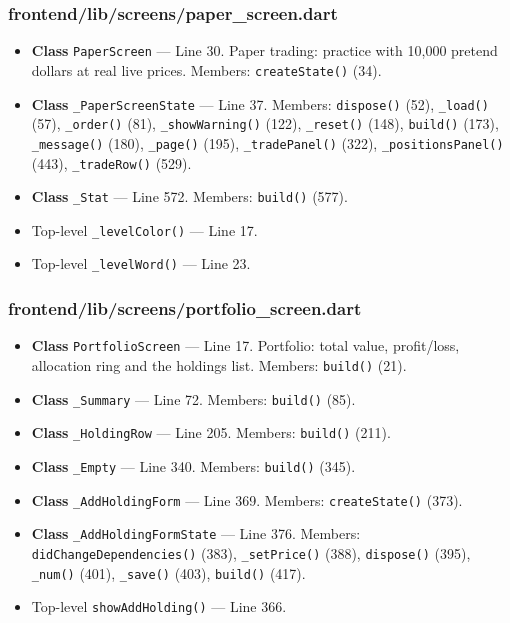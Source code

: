 \subsubsection*{frontend/lib/screens/paper\_screen.dart}
\begin{itemize}[nosep,leftmargin=1.5em]
\item \textbf{Class} \texttt{PaperScreen} --- Line 30. Paper trading: practice with 10,000 pretend dollars at real live prices. Members: \texttt{createState(\allowbreak{})} (34).
\item \textbf{Class} \texttt{\_\allowbreak{}PaperScreenState} --- Line 37. Members: \texttt{dispose(\allowbreak{})} (52), \texttt{\_\allowbreak{}load(\allowbreak{})} (57), \texttt{\_\allowbreak{}order(\allowbreak{})} (81), \texttt{\_\allowbreak{}showWarning(\allowbreak{})} (122), \texttt{\_\allowbreak{}reset(\allowbreak{})} (148), \texttt{build(\allowbreak{})} (173), \texttt{\_\allowbreak{}message(\allowbreak{})} (180), \texttt{\_\allowbreak{}page(\allowbreak{})} (195), \texttt{\_\allowbreak{}tradePanel(\allowbreak{})} (322), \texttt{\_\allowbreak{}positionsPanel(\allowbreak{})} (443), \texttt{\_\allowbreak{}tradeRow(\allowbreak{})} (529).
\item \textbf{Class} \texttt{\_\allowbreak{}Stat} --- Line 572. Members: \texttt{build(\allowbreak{})} (577).
\item Top-level \texttt{\_\allowbreak{}levelColor(\allowbreak{})} --- Line 17.
\item Top-level \texttt{\_\allowbreak{}levelWord(\allowbreak{})} --- Line 23.
\end{itemize}
\subsubsection*{frontend/lib/screens/portfolio\_screen.dart}
\begin{itemize}[nosep,leftmargin=1.5em]
\item \textbf{Class} \texttt{PortfolioScreen} --- Line 17. Portfolio: total value, profit/loss, allocation ring and the holdings list. Members: \texttt{build(\allowbreak{})} (21).
\item \textbf{Class} \texttt{\_\allowbreak{}Summary} --- Line 72. Members: \texttt{build(\allowbreak{})} (85).
\item \textbf{Class} \texttt{\_\allowbreak{}HoldingRow} --- Line 205. Members: \texttt{build(\allowbreak{})} (211).
\item \textbf{Class} \texttt{\_\allowbreak{}Empty} --- Line 340. Members: \texttt{build(\allowbreak{})} (345).
\item \textbf{Class} \texttt{\_\allowbreak{}AddHoldingForm} --- Line 369. Members: \texttt{createState(\allowbreak{})} (373).
\item \textbf{Class} \texttt{\_\allowbreak{}AddHoldingFormState} --- Line 376. Members: \texttt{didChangeDependencies(\allowbreak{})} (383), \texttt{\_\allowbreak{}setPrice(\allowbreak{})} (388), \texttt{dispose(\allowbreak{})} (395), \texttt{\_\allowbreak{}num(\allowbreak{})} (401), \texttt{\_\allowbreak{}save(\allowbreak{})} (403), \texttt{build(\allowbreak{})} (417).
\item Top-level \texttt{showAddHolding(\allowbreak{})} --- Line 366.
\end{itemize}
